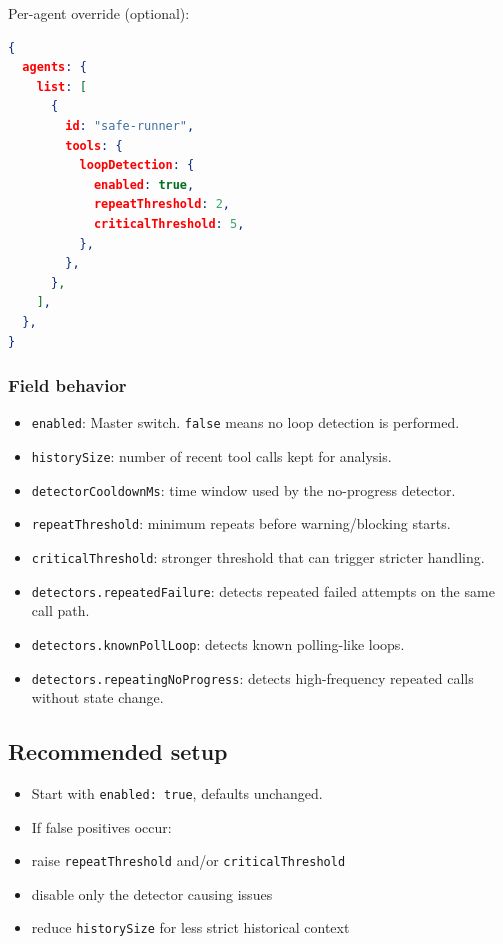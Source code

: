 Per-agent override (optional):

\begin{lstlisting}[language=json]
{
  agents: {
    list: [
      {
        id: "safe-runner",
        tools: {
          loopDetection: {
            enabled: true,
            repeatThreshold: 2,
            criticalThreshold: 5,
          },
        },
      },
    ],
  },
}
\end{lstlisting}


\subsubsection{Field behavior}


\begin{itemize}
  \item \texttt{enabled}: Master switch. \texttt{false} means no loop detection is performed.
  \item \texttt{historySize}: number of recent tool calls kept for analysis.
  \item \texttt{detectorCooldownMs}: time window used by the no-progress detector.
  \item \texttt{repeatThreshold}: minimum repeats before warning/blocking starts.
  \item \texttt{criticalThreshold}: stronger threshold that can trigger stricter handling.
  \item \texttt{detectors.repeatedFailure}: detects repeated failed attempts on the same call path.
  \item \texttt{detectors.knownPollLoop}: detects known polling-like loops.
  \item \texttt{detectors.repeatingNoProgress}: detects high-frequency repeated calls without state change.
\end{itemize}


\subsection{Recommended setup}


\begin{itemize}
  \item Start with \texttt{enabled: true}, defaults unchanged.
  \item If false positives occur:
  \item raise \texttt{repeatThreshold} and/or \texttt{criticalThreshold}
  \item disable only the detector causing issues
  \item reduce \texttt{historySize} for less strict historical context
\end{itemize}


